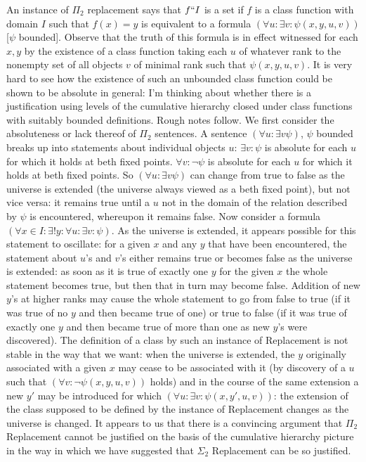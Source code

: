 \documentclass[12pt]{article}
\begin{document}
An instance of $\Pi_2$ replacement says that $f``I$ is a set if $f$ is a class function with domain $I$ such that $f(x)=y$ is equivalent to a
formula $(\forall u:\exists v:\psi(x,y,u,v))$ [$\psi$ bounded].  Observe that the truth of this formula is in effect witnessed for each $x,y$ by the existence of a
class function taking each $u$ of whatever rank to the nonempty set of all objects $v$ of minimal rank such that $\psi(x,y,u,v)$.  It is very hard to see how the existence of such an unbounded class function could be shown to be absolute in general:  I'm thinking about whether there is a justification using levels of the cumulative hierarchy closed under class functions with suitably bounded definitions.   Rough notes follow.   We first consider the absoluteness or lack thereof of $\Pi_2$ sentences.  A sentence $(\forall u:\exists v \psi)$, $\psi$ bounded breaks up into statements about individual
objects $u$:  $\exists v:\psi$ is absolute for each $u$ for which it holds at beth fixed points.  $\forall v: \neg\psi$ is absolute for each $u$ for which it holds at beth fixed points.  So $(\forall u:\exists v \psi)$ can change from true to false as the universe is extended (the universe always viewed as a beth fixed point), but not vice versa:  it remains true until a $u$ not in the domain of the relation described by $\psi$  is encountered, whereupon it remains false.  Now consider a formula $(\forall x \in I:\exists! y:\forall u:\exists v:\psi)$.  As the universe is extended, it appears possible for this statement to oscillate:   for a given $x$ and any $y$ that have been encountered,
the statement about $u$'s and $v$'s either remains true or becomes false as the universe is extended:  as soon as it is true of exactly one $y$ for the given $x$ the whole statement becomes true, but then that in turn may become false.  Addition of new $y$'s at higher ranks may cause the whole statement to go
from false to true (if it was true of no $y$ and then became true of one) or true to false (if it was true of exactly one $y$ and then became true of more than one as new $y$'s were discovered).   The definition of a class by such an instance of Replacement is not stable in the way that we want:  when the universe is extended, the $y$ originally associated with a given $x$ may cease to be associated with it (by discovery of a $u$ such that $(\forall v: \neg\psi(x,y,u,v))$ holds) and in the course of the same extension a new $y'$ may be introduced for which $(\forall u:\exists v: \psi(x,y',u,v))$:  the extension of the class supposed to be defined by the instance of Replacement changes as the universe is changed.  It appears to us that there is a convincing argument that $\Pi_2$ Replacement cannot be justified on the basis of the cumulative hierarchy picture in the way in which we have suggested that $\Sigma_2$ Replacement can be so justified.
\end{document}
